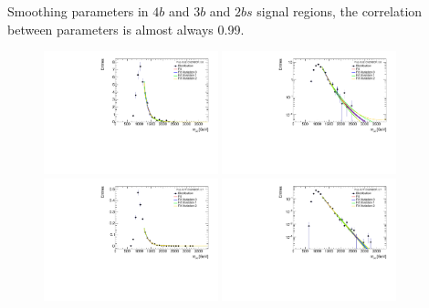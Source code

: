 \begin{table}[htbp!]
\begin{center}

\caption{Smoothing parameters in $4b$ and $3b$ and $2bs$ signal regions, the correlation between parameters is almost always 0.99.}
\label{tab:smoothparams_l}
\end{center}
\end{table}


\begin{figure}[htbp!]
\begin{center}
\includegraphics[angle=270, width=0.45\textwidth]{figures/boosted/Smooth/qcd_est_FourTag_Signal_mHH_l.pdf}
\includegraphics[angle=270, width=0.45\textwidth]{figures/boosted/Smooth/qcd_est_FourTag_Signal_mHH_l_l.pdf}\\ 
\includegraphics[angle=270, width=0.45\textwidth]{figures/boosted/Smooth/ttbar_est_FourTag_Signal_mHH_l.pdf}
\includegraphics[angle=270, width=0.45\textwidth]{figures/boosted/Smooth/ttbar_est_FourTag_Signal_mHH_l_l.pdf}\\

\end{center}
\end{figure}

